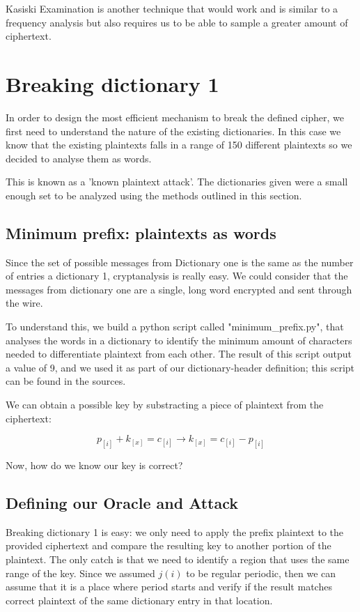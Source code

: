 \documentclass[pdftex,12pt,letter]{article}
\begin{document}
Kasiski Examination is another technique that would work and is similar to 
a frequency analysis but also requires us to be able to sample a greater amount 
of ciphertext.


\section{Breaking dictionary 1}

In order to design the most efficient mechanism to break the defined cipher, we 
first need to understand the nature of the existing dictionaries. In this case
we know that the existing plaintexts falls in a range of 150 different plaintexts
so we decided to analyse them as words.

This is known as a 'known plaintext attack'. The dictionaries given were a small 
enough set to be analyzed using the methods outlined in this section. 

\subsection{Minimum prefix: plaintexts as words}

Since the set of possible messages from Dictionary one is the same as the number of 
entries a dictionary 1, cryptanalysis is really easy. We could consider that the 
messages from dictionary one are a single, long word encrypted and sent through the wire.

To understand this, we build a python script called "minimum\_prefix.py", that analyses the 
words in a dictionary to identify the minimum amount of characters needed to differentiate
plaintext from each other. The result of this script output a value of 9, and we used it
as part of our dictionary-header definition; this script can be found in the sources.


We can obtain a possible key by substracting a piece of plaintext from the ciphertext:

\begin{equation}
    p_{[i]} + k_{[x]} = c_{[i]} \rightarrow k_{[x]} = c_{[i]} - p_{[i]}
\end{equation}

Now, how do we know our key is correct?

\subsection{Defining our Oracle and Attack}

Breaking dictionary 1 is easy: we only need to apply the prefix plaintext to
the provided ciphertext and compare the resulting  key to another portion of
the plaintext. The only catch is that we need to identify a region that uses
the same range of the key. Since we assumed $j(i)$ to be regular periodic, then
we can assume that it is a place where period starts and verify if the result
matches correct plaintext of the same dictionary entry in that location. 
\end{document}

